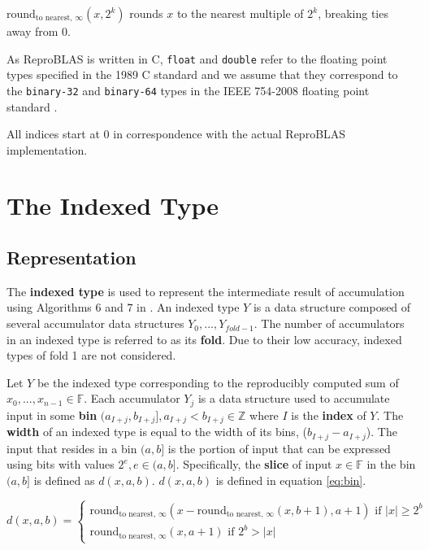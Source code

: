 \documentclass[12pt]{article}
\providecommand{\F}{\ensuremath{\mathbb{F}}}
\providecommand{\Z}{\ensuremath{\mathbb{Z}}}
\providecommand{\roundtonearestinfty}{\ensuremath{\text{round}_\text{to nearest, $\infty$}}}
\theoremstyle{plain}
\begin{document}
  $\roundtonearestinfty(x, 2^k)$ rounds $x$ to the nearest multiple of $2^k$, breaking ties away from 0.

  As ReproBLAS is written in C, \verb|float| and \verb|double| refer to the floating point types specified in the 1989 C standard \cite{c89} and we assume that they correspond to the \verb|binary-32| and \verb|binary-64| types in the IEEE 754-2008 floating point standard \cite{ieee754}.

  All indices start at $0$ in correspondence with the actual ReproBLAS implementation.

\section{The Indexed Type}
  \subsection{Representation}
    The \textbf{indexed type} is used to represent the intermediate result of accumulation using Algorithms 6 and $7$ in \cite{repsum}.
    An indexed type $Y$ is a data structure composed of several accumulator data structures $Y_0, ..., Y_{fold - 1}$. The number of accumulators in an indexed type is referred to as its \textbf{fold}. Due to their low accuracy, indexed types of fold 1 are not considered.

    Let $Y$ be the indexed type corresponding to the reproducibly computed sum of $x_0, ..., x_{n - 1} \in \F$.
    Each accumulator $Y_j$ is a data structure used to accumulate input in some \textbf{bin} $(a_{I + j}, b_{I + j}], a_{I + j} < b_{I + j} \in \Z$ where $I$ is the \textbf{index} of $Y$. The \textbf{width} of an indexed type is equal to the width of its bins, ($b_{I + j} - a_{I + j}$). The input that resides in a bin $(a, b]$ is the portion of input that can be expressed using bits with values $2^e, e \in (a, b]$. Specifically, the \textbf{slice} of input $x \in \F$ in the bin $(a, b]$ is defined as $d(x, a, b)$. $d(x, a, b)$ is defined in equation \ref{eq:bin}.

    \begin{equation}
      \label{eq:bin}
      d(x, a, b) = \begin{cases}\roundtonearestinfty(x - \roundtonearestinfty(x, b + 1), a + 1) \text{ if } |x| \geq 2^b \\ \roundtonearestinfty(x, a + 1) \text{ if } 2^b > |x| \end{cases}
    \end{equation}
\end{document}
